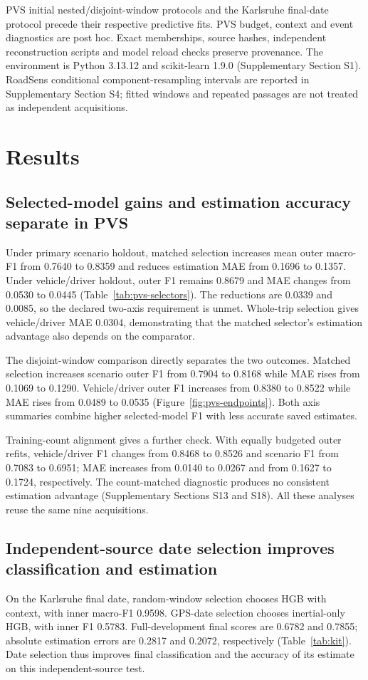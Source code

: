PVS initial nested/disjoint-window protocols and the Karlsruhe final-date protocol precede their respective predictive fits. PVS budget, context and event diagnostics are post hoc. Exact memberships, source hashes, independent reconstruction scripts and model reload checks preserve provenance. The environment is Python 3.13.12 and scikit-learn 1.9.0 (Supplementary Section S1). RoadSens conditional component-resampling intervals are reported in Supplementary Section S4; fitted windows and repeated passages are not treated as independent acquisitions.

\section{Results}
\subsection{Selected-model gains and estimation accuracy separate in PVS}
Under primary scenario holdout, matched selection increases mean outer macro-F1 from 0.7640 to 0.8359 and reduces estimation MAE from 0.1696 to 0.1357. Under vehicle/driver holdout, outer F1 remains 0.8679 and MAE changes from 0.0530 to 0.0445 (Table~\ref{tab:pvs-selectors}). The reductions are 0.0339 and 0.0085, so the declared two-axis requirement is unmet. Whole-trip selection gives vehicle/driver MAE 0.0304, demonstrating that the matched selector's estimation advantage also depends on the comparator.

The disjoint-window comparison directly separates the two outcomes. Matched selection increases scenario outer F1 from 0.7904 to 0.8168 while MAE rises from 0.1069 to 0.1290. Vehicle/driver outer F1 increases from 0.8380 to 0.8522 while MAE rises from 0.0489 to 0.0535 (Figure~\ref{fig:pvs-endpoints}). Both axis summaries combine higher selected-model F1 with less accurate saved estimates.

Training-count alignment gives a further check. With equally budgeted outer refits, vehicle/driver F1 changes from 0.8468 to 0.8526 and scenario F1 from 0.7083 to 0.6951; MAE increases from 0.0140 to 0.0267 and from 0.1627 to 0.1724, respectively. The count-matched diagnostic produces no consistent estimation advantage (Supplementary Sections S13 and S18). All these analyses reuse the same nine acquisitions.

\subsection{Independent-source date selection improves classification and estimation}
On the Karlsruhe final date, random-window selection chooses HGB with context, with inner macro-F1 0.9598. GPS-date selection chooses inertial-only HGB, with inner F1 0.5783. Full-development final scores are 0.6782 and 0.7855; absolute estimation errors are 0.2817 and 0.2072, respectively (Table~\ref{tab:kit}). Date selection thus improves final classification and the accuracy of its estimate on this independent-source test.

